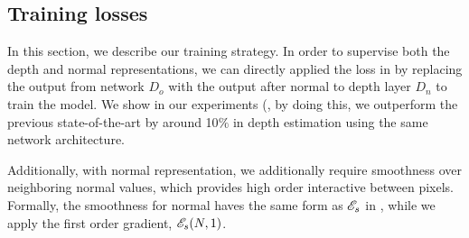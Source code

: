 

\subsection{Training losses}
\label{sub:training_losses}
In this section, we describe our training strategy. In order to supervise both the depth and normal representations, we can directly applied the loss in  by replacing the output from network $D_o$ with the output after normal to depth layer $D_n$ to train the model. We show in our experiments (, by doing this, we outperform the previous state-of-the-art by around 10$\%$ in depth estimation using the same network architecture.

Additionally, with normal representation, we additionally require smoothness over neighboring normal values, which provides high order interactive between pixels. Formally, the smoothness for normal haves the same form as ${\mathscr E}_{s}$ in , while we apply the first order gradient, \ie ${\mathscr E}_{s}(N, 1)$. 


